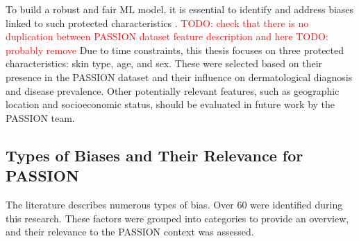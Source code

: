 \documentclass[12pt, a4paper, oneside]{book}   	%
\renewcommand{\todo}[1]{\textcolor{red}{TODO: #1}}
\begin{document}
			
			To build a robust and fair \gls{ML} model, it is essential to identify and address biases linked to such protected characteristics \autocite{Mehrabi2022}.
			\todo{check that there is no duplication between PASSION dataset feature description and here}
			\todo{probably remove}
			Due to time constraints, this thesis focuses on three protected characteristics: skin type, age, and sex. These were selected based on their presence in the PASSION dataset and their influence on dermatological diagnosis and disease prevalence. Other potentially relevant features, such as geographic location and socioeconomic status, should be evaluated in future work by the PASSION team.
			
			

			
			\subsection{Types of Biases and Their Relevance for PASSION}
			The literature describes numerous types of bias. Over 60 were identified during this research. These factors were grouped into categories to provide an overview, and their relevance to the PASSION context was assessed.
			
\end{document}
